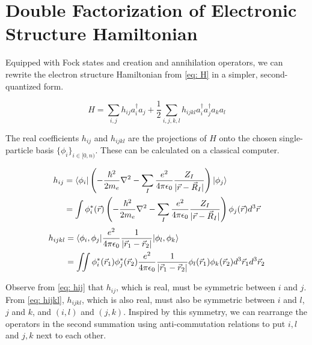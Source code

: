 \section{Double Factorization of Electronic Structure Hamiltonian}

Equipped with Fock states and creation and annihilation operators, we can rewrite the electron structure Hamiltonian from \eqref{eq: H} in a simpler, second-quantized form.

\begin{equation}
    H = \sum_{i, j} h_{ij}a^\dag_ia_j + \frac{1}{2}\sum_{i,j,k,l} h_{ijkl}a^\dag_ia^\dag_ja_ka_l \label{eq: H2}
\end{equation}

The real coefficients $h_{ij}$ and $h_{ijkl}$ are the projections of $H$ onto the chosen single-particle basis $\{\phi_i\}_{i \in [0, n)}$. These can be calculated on a classical computer.

\begin{equation}
    \begin{split}
        h_{ij} &= \braket{\phi_i | \left(-\frac{\hbar^2}{2m_e}\nabla^2 - \sum_I \frac{e^2}{4\pi\epsilon_0}\frac{Z_I}{|\vec{r} - \vec{R}_I|}\right) | \phi_j} \\
        &= \int \phi^*_i(\vec{r})\left(-\frac{\hbar^2}{2m_e}\nabla^2 - \sum_I \frac{e^2}{4\pi\epsilon_0}\frac{Z_I}{|\vec{r} - \vec{R}_I|}\right)\phi_j(\vec{r}) d^3\vec{r}
    \end{split}
    \label{eq: hij}
\end{equation}
\begin{equation}
    \begin{split}
        h_{ijkl} &= \braket{\phi_i, \phi_j | \frac{e^2}{4\pi\epsilon_0}\frac{1}{|\vec{r}_1 - \vec{r}_2|} | \phi_l, \phi_k} \\
        &= \iint \phi^*_i(\vec{r}_1)\phi^*_j(\vec{r}_2)\frac{e^2}{4\pi\epsilon_0}\frac{1}{|\vec{r}_1 - \vec{r}_2|}\phi_l(\vec{r}_1)\phi_k(\vec{r}_2) d^3\vec{r}_1d^3\vec{r}_2
    \end{split}
    \label{eq: hijkl}
\end{equation}

Observe from \eqref{eq: hij} that $h_{ij}$, which is real, must be symmetric between $i$ and $j$. From \eqref{eq: hijkl}, $h_{ijkl}$, which is also real, must also be symmetric between $i$ and $l$, $j$ and $k$, and $(i, l)$ and $(j, k)$. Inspired by this symmetry, we can rearrange the operators in the second summation using anti-commutation relations to put $i, l$ and $j, k$ next to each other.

